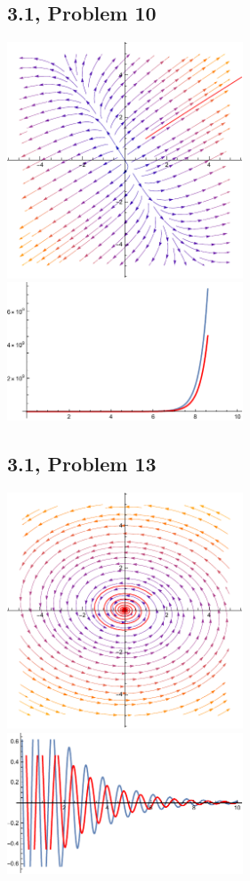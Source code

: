 \documentclass[10pt]{mypackage}
\begin{document}
\subsection{3.1, Problem 10}%
\begin{center}
  \includegraphics[width=7cm]{images/3_1_10_a.pdf} \includegraphics[width=7cm]{images/3_1_10_b.pdf}
\end{center}
\subsection{3.1, Problem 13}%
\begin{center}
  \includegraphics[width=7cm]{images/3_1_13_a.pdf} \includegraphics[width=7cm]{images/3_1_13_b.pdf}
\end{center}
\end{document}
